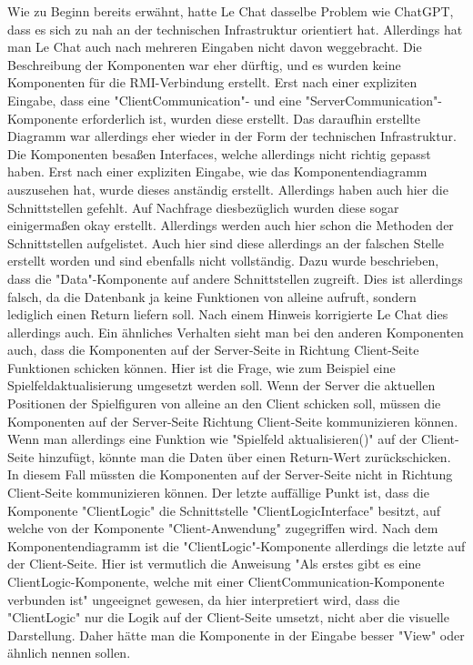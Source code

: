 Wie zu Beginn bereits erwähnt, hatte Le Chat dasselbe Problem wie ChatGPT, dass es sich zu nah an der technischen Infrastruktur orientiert 
hat. Allerdings hat man Le Chat auch nach mehreren Eingaben nicht davon weggebracht. Die Beschreibung der Komponenten war eher dürftig, und 
es wurden keine Komponenten für die RMI-Verbindung erstellt. Erst nach einer expliziten Eingabe, dass eine "ClientCommunication"- und eine 
"ServerCommunication"-Komponente erforderlich ist, wurden diese erstellt. Das daraufhin erstellte Diagramm war allerdings eher wieder in der 
Form der technischen Infrastruktur. Die Komponenten besaßen Interfaces, welche allerdings nicht richtig gepasst haben. Erst nach einer 
expliziten Eingabe, wie das Komponentendiagramm auszusehen hat, wurde dieses anständig erstellt. Allerdings haben auch hier die 
Schnittstellen gefehlt. Auf Nachfrage diesbezüglich wurden diese sogar einigermaßen okay erstellt. Allerdings werden auch hier schon die 
Methoden der Schnittstellen aufgelistet. Auch hier sind diese allerdings an der falschen Stelle erstellt worden und sind ebenfalls nicht 
vollständig. Dazu wurde beschrieben, dass die "Data"-Komponente auf andere Schnittstellen zugreift. Dies ist allerdings falsch, da die 
Datenbank ja keine Funktionen von alleine aufruft, sondern lediglich einen Return liefern soll. Nach einem Hinweis korrigierte Le Chat dies 
allerdings auch. Ein ähnliches Verhalten sieht man bei den anderen Komponenten auch, dass die Komponenten auf der Server-Seite in Richtung 
Client-Seite Funktionen schicken können. Hier ist die Frage, wie zum Beispiel eine Spielfeldaktualisierung umgesetzt werden soll. Wenn der 
Server die aktuellen Positionen der Spielfiguren von alleine an den Client schicken soll, müssen die Komponenten auf der Server-Seite Richtung 
Client-Seite kommunizieren können. Wenn man allerdings eine Funktion wie "Spielfeld aktualisieren()" auf der Client-Seite hinzufügt, könnte 
man die Daten über einen Return-Wert zurückschicken. In diesem Fall müssten die Komponenten auf der Server-Seite nicht in Richtung Client-Seite 
kommunizieren können. Der letzte auffällige Punkt ist, dass die Komponente "ClientLogic" die Schnittstelle "ClientLogicInterface" besitzt, 
auf welche von der Komponente "Client-Anwendung" zugegriffen wird. Nach dem Komponentendiagramm ist die "ClientLogic"-Komponente allerdings die 
letzte auf der Client-Seite. Hier ist vermutlich die Anweisung "Als erstes gibt es eine ClientLogic-Komponente, welche mit einer 
ClientCommunication-Komponente verbunden ist" ungeeignet gewesen, da hier interpretiert wird, dass die "ClientLogic" nur die Logik auf der 
Client-Seite umsetzt, nicht aber die visuelle Darstellung. Daher hätte man die Komponente in der Eingabe besser "View" oder ähnlich nennen 
sollen.

